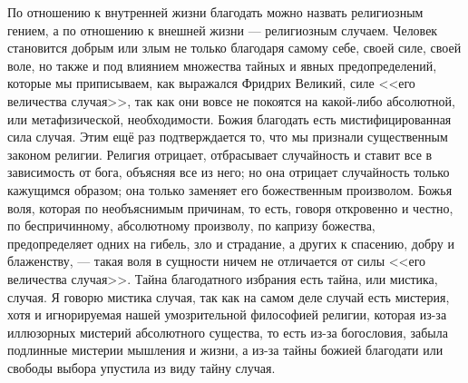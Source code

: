 \documentclass[12pt,oneside]{book}
\begin{document}
По отношению к внутренней жизни благодать можно назвать религиозным гением, а по отношению к внешней жизни --- религиозным случаем. Человек становится добрым или злым не только благодаря самому себе, своей силе, своей воле, но также и под влиянием множества тайных и явных предопределений, которые мы приписываем, как выражался Фридрих Великий, силе <<его величества случая>>, так как они вовсе не покоятся на какой-либо абсолютной, или метафизической, необходимости\dag\let\svthefootnote\thefootnote\let\thefootnote\relax{}\let\thefootnote\svthefootnote. Божия благодать есть мистифицированная сила случая. Этим ещё раз подтверждается то, что мы признали существенным законом религии. Религия отрицает, отбрасывает случайность и ставит все в зависимость от бога, объясняя все из него; но она отрицает случайность только кажущимся образом; она только заменяет его божественным произволом. Божья воля, которая по необъяснимым причинам, то есть, говоря откровенно и честно, по беспричинному, абсолютному произволу, по капризу божества, предопределяет одних на гибель, зло и страдание, а других к спасению, добру и блаженству, --- такая воля в сущности ничем не отличается от силы <<его величества случая>>. Тайна благодатного избрания есть тайна, или мистика, случая. Я говорю мистика случая, так как на самом деле случай есть мистерия, хотя и игнорируемая нашей умозрительной философией религии, которая из-за иллюзорных мистерий абсолютного существа, то есть из-за богословия, забыла подлинные мистерии мышления и жизни, а из-за тайны божией благодати или свободы выбора упустила из виду тайну случая\ddag\let\svthefootnote\thefootnote\let\thefootnote\relax{}\let\thefootnote\svthefootnote.
\end{document}
